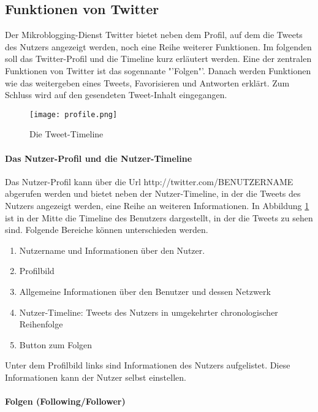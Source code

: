 		\subsection{Funktionen von Twitter}
			
			Der Mikroblogging-Dienst Twitter bietet neben dem Profil, auf dem die Tweets des Nutzers angezeigt werden, noch eine Reihe weiterer Funktionen. 
			Im folgenden soll das Twitter-Profil und die Timeline kurz erläutert werden. 
			Eine der zentralen Funktionen von Twitter ist das sogennante "'Folgen"'.
			Danach werden Funktionen wie das weitergeben eines Tweets, Favorisieren und Antworten erklärt. 
			Zum Schluss wird auf den gesendeten Tweet-Inhalt eingegangen.

			\begin{figure}[h!]
			\begin{center}
			\texttt{[image: profile.png]}
			\caption{Die Tweet-Timeline}
			\label{img:twitterProfile}
			\end{center}
			\end{figure}	


			\paragraph{Das Nutzer-Profil und die Nutzer-Timeline}
				Das Nutzer-Profil kann über die Url http://twitter.com/BENUTZERNAME abgerufen werden und bietet neben der Nutzer-Timeline, in der die Tweets des Nutzers angezeigt werden, eine Reihe an weiteren Informationen.
				In Abbildung \ref{img:twitterProfile} ist in der Mitte die Timeline des Benutzers dargestellt, in der die Tweets zu sehen sind. 
				Folgende Bereiche können unterschieden werden.
				\begin{enumerate}
					\item Nutzername und Informationen über den Nutzer. 
					\item Profilbild
					\item Allgemeine Informationen über den Benutzer und dessen Netzwerk
					\item Nutzer-Timeline: Tweets des Nutzers in umgekehrter chronologischer Reihenfolge 
					\item Button zum Folgen
				\end{enumerate}
				
				Unter dem Profilbild links sind Informationen des Nutzers aufgelistet.
				Diese Informationen kann der Nutzer selbst einstellen.   

			\paragraph{Folgen (Following/Follower)}
				
